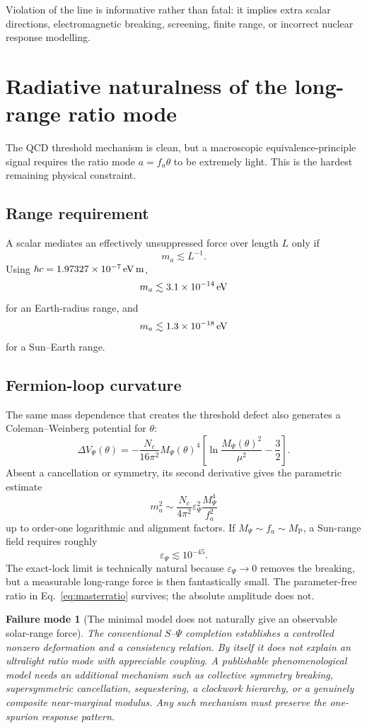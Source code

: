 \documentclass[11pt,a4paper]{article}
\newtheorem{failure}[definition]{Failure mode}
\newcommand{\MP}{M_{\mathrm P}}
\begin{document}
Violation of the line is informative rather than fatal: it implies extra scalar directions, electromagnetic breaking, screening, finite range, or incorrect nuclear response modelling.

\section{Radiative naturalness of the long-range ratio mode}
\label{sec:naturalness}

The QCD threshold mechanism is clean, but a macroscopic equivalence-principle signal requires the ratio mode $a=f_a\theta$ to be extremely light. This is the hardest remaining physical constraint.

\subsection{Range requirement}

A scalar mediates an effectively unsuppressed force over length $L$ only if
\[
m_a\lesssim L^{-1}.
\]
Using $\hbar c=1.97327\times10^{-7}\,{\rm eV\,m}$,
\[
m_a\lesssim3.1\times10^{-14}\,{\rm eV}
\]
for an Earth-radius range, and
\[
m_a\lesssim1.3\times10^{-18}\,{\rm eV}
\]
for a Sun--Earth range.

\subsection{Fermion-loop curvature}

The same mass dependence that creates the threshold defect also generates a Coleman--Weinberg potential for $\theta$:
\[
\Delta V_\Psi(\theta)
=-\frac{N_c}{16\pi^2}M_\Psi(\theta)^4
\left[
\ln\frac{M_\Psi(\theta)^2}{\mu^2}-\frac32
\right].
\label{eq:CWtheta}
\]
Absent a cancellation or symmetry, its second derivative gives the parametric estimate
\[
\boxed{
m_a^2
\sim
\frac{N_c}{4\pi^2}
\varepsilon_\Psi^2
\frac{M_\Psi^4}{f_a^2}
}
\label{eq:radiativemass}
\]
up to order-one logarithmic and alignment factors. If $M_\Psi\sim f_a\sim\MP$, a Sun-range field requires roughly
\[
\varepsilon_\Psi\lesssim10^{-45}.
\]
The exact-lock limit is technically natural because $\varepsilon_\Psi\to0$ removes the breaking, but a measurable long-range force is then fantastically small. The parameter-free ratio in Eq.~\eqref{eq:masterratio} survives; the absolute amplitude does not.

\begin{failure}[The minimal model does not naturally give an observable solar-range force]
The conventional $S$--$\Psi$ completion establishes a controlled nonzero deformation and a consistency relation. By itself it does not explain an ultralight ratio mode with appreciable coupling. A publishable phenomenological model needs an additional mechanism such as collective symmetry breaking, supersymmetric cancellation, sequestering, a clockwork hierarchy, or a genuinely composite near-marginal modulus. Any such mechanism must preserve the one-spurion response pattern.
\end{failure}
\end{document}
